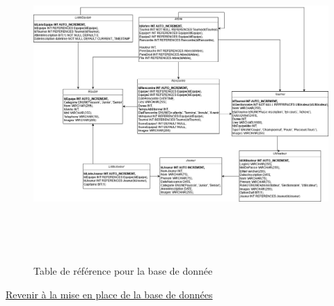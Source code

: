 \documentclass[12pt]{report}
\begin{document}
	    \begin{figure}[!h]
			\centering
				\includegraphics[height=12cm]{figures/bdd-rapport-3-meerkat.png}
			\caption{Table de référence pour la base de donnée}
		\end{figure}
		\hyperlink{bdd-retour-annexe}{Revenir à la mise en place de la base de données}
		\bigskip
		
	    
	    \newpage
        
\end{document}
